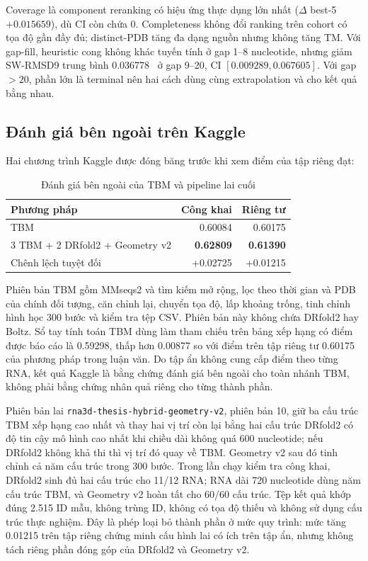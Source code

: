 \documentclass[12pt,a4paper,oneside]{report}
\newcommand{\angstrom}{\text{\AA}}
\begin{document}
Coverage là component reranking có hiệu ứng thực dụng lớn nhất ($\Delta$ best-5
$+0.015659$), dù CI còn chứa 0. Completeness không đổi ranking trên cohort có tọa độ
gần đầy đủ; distinct-PDB tăng đa dạng nguồn nhưng không tăng TM. Với gap-fill, heuristic
cong không khác tuyến tính ở gap 1--8 nucleotide, nhưng giảm SW-RMSD9 trung bình
0.036778~\angstrom{} ở gap 9--20, CI $[0.009289,0.067605]$. Với gap $>20$, phần lớn
là terminal nên hai cách dùng cùng extrapolation và cho kết quả bằng nhau.

\subsection{Đánh giá bên ngoài trên Kaggle}

Hai chương trình Kaggle được đóng băng trước khi xem điểm của tập riêng đạt:

\begin{table}[H]
\centering
\caption{Đánh giá bên ngoài của TBM và pipeline lai cuối}
\begin{tabular}{lrr}
\toprule
Phương pháp & Công khai & Riêng tư\\
\midrule
TBM & 0.60084 & 0.60175\\
3 TBM + 2 DRfold2 + Geometry v2 & \textbf{0.62809} & \textbf{0.61390}\\
Chênh lệch tuyệt đối & +0.02725 & +0.01215\\
\bottomrule
\end{tabular}
\end{table}

Phiên bản TBM gồm MMseqs2 và tìm kiếm mở rộng, lọc theo thời gian và PDB của chính
đối tượng, căn chỉnh lại, chuyển tọa độ, lấp khoảng trống, tinh chỉnh hình học 300 bước
và kiểm tra tệp CSV. Phiên bản này không chứa DRfold2 hay Boltz. Sổ tay tính
toán TBM dùng làm tham chiếu trên bảng xếp hạng có điểm được báo cáo là 0.59298, thấp
hơn 0.00877 so với điểm trên tập riêng tư 0.60175 của phương pháp trong luận văn. Do tập ẩn không cung
cấp điểm theo từng RNA, kết quả Kaggle là bằng chứng đánh giá bên ngoài cho toàn nhánh
TBM, không phải bằng chứng nhân quả riêng cho từng thành phần.

Phiên bản lai \texttt{rna3d-thesis-hybrid-geometry-v2}, phiên bản 10, giữ ba cấu trúc
TBM xếp hạng cao nhất và thay hai vị trí còn lại bằng hai cấu trúc DRfold2 có độ tin cậy
mô hình cao nhất khi chiều dài không quá 600 nucleotide; nếu DRfold2 không khả thi thì
vị trí đó quay về TBM. Geometry v2 sau đó tinh chỉnh cả năm cấu trúc trong 300 bước.
Trong lần chạy kiểm tra công khai, DRfold2 sinh đủ hai cấu trúc cho 11/12 RNA; RNA dài
720 nucleotide dùng năm cấu trúc TBM, và Geometry v2 hoàn tất cho 60/60 cấu trúc. Tệp
kết quả khớp đúng 2.515 ID mẫu, không trùng ID, không có tọa độ thiếu và không sử dụng
cấu trúc thực nghiệm. Đây là phép loại bỏ thành phần ở mức quy trình: mức tăng 0.01215
trên tập riêng chứng minh cấu hình lai có ích trên tập ẩn, nhưng không tách riêng phần
đóng góp của DRfold2 và Geometry v2.
\end{document}
